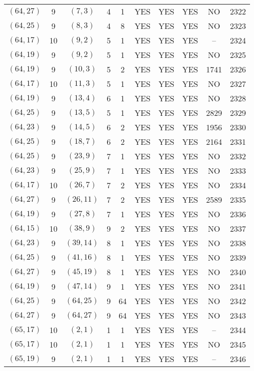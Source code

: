 \begin{longtable}{|c|c|c|c|c|c|c|c|c|c|}
$(64, 27)$ & 9 & $(7, 3)$ & 4 & 1 & YES & YES & YES & NO & 2322\\
$(64, 25)$ & 9 & $(8, 3)$ & 4 & 8 & YES & YES & YES & NO & 2323\\
$(64, 17)$ & 10 & $(9, 2)$ & 5 & 1 & YES & YES & YES & -- & 2324\\
$(64, 19)$ & 9 & $(9, 2)$ & 5 & 1 & YES & YES & YES & NO & 2325\\
$(64, 19)$ & 9 & $(10, 3)$ & 5 & 2 & YES & YES & YES & 1741 & 2326\\
$(64, 17)$ & 10 & $(11, 3)$ & 5 & 1 & YES & YES & YES & NO & 2327\\
$(64, 19)$ & 9 & $(13, 4)$ & 6 & 1 & YES & YES & YES & NO & 2328\\
$(64, 25)$ & 9 & $(13, 5)$ & 5 & 1 & YES & YES & YES & 2829 & 2329\\
$(64, 23)$ & 9 & $(14, 5)$ & 6 & 2 & YES & YES & YES & 1956 & 2330\\
$(64, 25)$ & 9 & $(18, 7)$ & 6 & 2 & YES & YES & YES & 2164 & 2331\\
$(64, 25)$ & 9 & $(23, 9)$ & 7 & 1 & YES & YES & YES & NO & 2332\\
$(64, 23)$ & 9 & $(25, 9)$ & 7 & 1 & YES & YES & YES & NO & 2333\\
$(64, 17)$ & 10 & $(26, 7)$ & 7 & 2 & YES & YES & YES & NO & 2334\\
$(64, 27)$ & 9 & $(26, 11)$ & 7 & 2 & YES & YES & YES & 2589 & 2335\\
$(64, 19)$ & 9 & $(27, 8)$ & 7 & 1 & YES & YES & YES & NO & 2336\\
$(64, 15)$ & 10 & $(38, 9)$ & 9 & 2 & YES & YES & YES & NO & 2337\\
$(64, 23)$ & 9 & $(39, 14)$ & 8 & 1 & YES & YES & YES & NO & 2338\\
$(64, 25)$ & 9 & $(41, 16)$ & 8 & 1 & YES & YES & YES & NO & 2339\\
$(64, 27)$ & 9 & $(45, 19)$ & 8 & 1 & YES & YES & YES & NO & 2340\\
$(64, 19)$ & 9 & $(47, 14)$ & 9 & 1 & YES & YES & YES & NO & 2341\\
$(64, 25)$ & 9 & $(64, 25)$ & 9 & 64 & YES & YES & YES & NO & 2342\\
$(64, 27)$ & 9 & $(64, 27)$ & 9 & 64 & YES & YES & YES & NO & 2343\\
$(65, 17)$ & 10 & $(2, 1)$ & 1 & 1 & YES & YES & YES & -- & 2344\\
$(65, 17)$ & 10 & $(2, 1)$ & 1 & 1 & YES & YES & YES & NO & 2345\\
$(65, 19)$ & 9 & $(2, 1)$ & 1 & 1 & YES & YES & YES & -- & 2346\\

\end{longtable}
